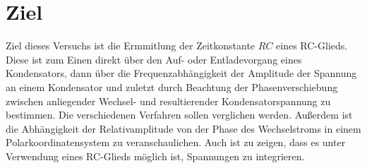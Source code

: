 \section{Ziel}
Ziel dieses Versuchs ist die Ermmitlung der Zeitkonstante $RC$ eines RC-Glieds.
Diese ist zum Einen direkt über den Auf- oder Entladevorgang eines Kondensators,
dann über die Frequenzabhängigkeit der Amplitude der Spannung an einem
Kondensator und zuletzt durch Beachtung der Phasenverschiebung zwischen
anliegender Wechsel- und resultierender Kondensatorspannung zu bestimmen. Die verschiedenen
Verfahren sollen verglichen werden. Außerdem ist die Abhängigkeit der
Relativamplitude von der Phase des Wechselstroms in einem Polarkoordinatensystem
zu veranschaulichen. Auch ist zu zeigen, dass es unter Verwendung eines RC-Glieds
möglich ist, Spannungen zu integrieren.
\label{sec:Ziel}
